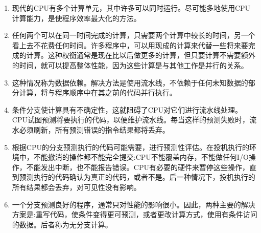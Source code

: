 \begin{enumerate}
\item 
现代的CPU有多个计算单元，其中许多可以同时运行。尽可能多地使用CPU计算能力，是使程序效率最大化的方法。

\item 
任何两个可以在同一时间完成的计算，只需要两个计算中较长的时间，另一个看上去不花费任何时间。许多程序中，可以用现成的计算来代替一些将来要完成的计算。这种权衡通常是现在比以后做更多的计算，但只要计算不需要额外的时间，就可以提高整体性能，因为这些计算是与其他工作是并行的关系。

\item 
这种情况称为数据依赖。解决方法是使用流水线，不依赖于任何未知数据的部分计算，将与程序顺序中在其之前的代码并行执行。

\item
条件分支使计算具有不确定性，这就阻碍了CPU对它们进行流水线处理。CPU试图预测将要执行的代码，以便维护流水线。每当这样的预测失败时，流水必须刷新，所有预测错误的指令结果都将丢弃。

\item
根据CPU的分支预测执行的代码可能需要，进行预测性评估。在投机执行的环境中，不能撤消的操作都不能完全提交:CPU不能覆盖内存，不能做任何I/O操作，不能发出中断，也不能报告错误。CPU有必要的硬件来暂停这些操作，直到预测执行的代码确认为真正的代码，或者不是。后一种情况下，投机执行的所有结果都会丢弃，对可见性没有影响。

\item 
一个分支预测良好的程序，通常只对性能的影响很小。因此，两种主要的解决方案是:重写代码，使条件变得更可预测，或者更改计算方式，使用有条件访问的数据。后者称为无分支计算。
	
\end{enumerate}